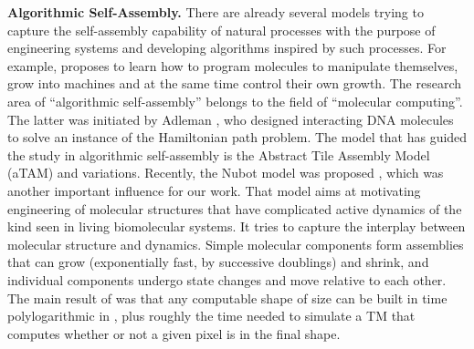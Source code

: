 \documentclass[oribibl, 11pt]{llncs}
\begin{document}
\noindent\textbf{Algorithmic Self-Assembly.} There are already several models trying to capture the self-assembly capability of natural processes with the purpose of engineering systems and developing algorithms inspired by such processes. For example, \cite{Do12} proposes to learn how to program molecules to manipulate themselves, grow into machines and at the same time control their own growth. The research area of ``algorithmic self-assembly'' belongs to the field of ``molecular computing''. The latter was initiated by Adleman \cite{Ad94}, who designed interacting DNA molecules to solve an instance of the Hamiltonian path problem. The model that has guided the study in algorithmic self-assembly is the Abstract Tile Assembly Model (aTAM) \cite{Wi98,RW00} and variations. Recently, the Nubot model was proposed \cite{WCG13}, which was another important influence for our work. That model aims at motivating engineering of molecular structures that have complicated active dynamics of the kind seen in living biomolecular systems. It tries to capture the interplay between molecular structure and dynamics. Simple molecular components form assemblies that can grow (exponentially fast, by successive doublings) and shrink, and individual components undergo state changes and move relative to each other. The main result of \cite{WCG13} was that any computable shape of size  can be built in time polylogarithmic in , plus roughly the time needed to simulate a TM that computes whether or not a given pixel is in the final shape.\\
\end{document}

